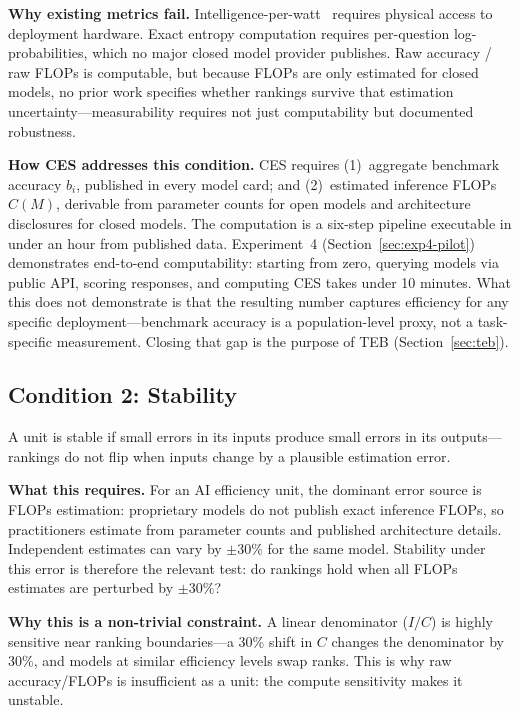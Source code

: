 \documentclass[12pt]{article}
\begin{document}
\textbf{Why existing metrics fail.} Intelligence-per-watt~\cite{saadfalcon2024} requires
physical access to deployment hardware. Exact entropy computation requires per-question
log-probabilities, which no major closed model provider publishes. Raw accuracy / raw FLOPs
is computable, but because FLOPs are only estimated for closed models, no prior work
specifies whether rankings survive that estimation uncertainty---measurability requires not
just computability but documented robustness.

\textbf{How CES addresses this condition.} CES requires (1)~aggregate benchmark accuracy
$b_i$, published in every model card; and (2)~estimated inference FLOPs $C(M)$, derivable
from parameter counts for open models and architecture disclosures for closed models. The
computation is a six-step pipeline executable in under an hour from published data.
Experiment~4 (Section~\ref{sec:exp4-pilot}) demonstrates end-to-end computability: starting
from zero, querying models via public API, scoring responses, and computing CES takes under
10 minutes. What this does not demonstrate is that the resulting number captures efficiency
for any specific deployment---benchmark accuracy is a population-level proxy, not a
task-specific measurement. Closing that gap is the purpose of TEB (Section~\ref{sec:teb}).

\subsection{Condition 2: Stability}

A unit is stable if small errors in its inputs produce small errors in its outputs---rankings
do not flip when inputs change by a plausible estimation error.

\textbf{What this requires.} For an AI efficiency unit, the dominant error source is FLOPs
estimation: proprietary models do not publish exact inference FLOPs, so practitioners
estimate from parameter counts and published architecture details. Independent estimates can
vary by $\pm30\%$ for the same model. Stability under this error is therefore the relevant
test: do rankings hold when all FLOPs estimates are perturbed by $\pm30\%$?

\textbf{Why this is a non-trivial constraint.} A linear denominator ($I/C$) is highly
sensitive near ranking boundaries---a 30\% shift in $C$ changes the denominator by 30\%,
and models at similar efficiency levels swap ranks. This is why raw accuracy/FLOPs is
insufficient as a unit: the compute sensitivity makes it unstable.
\end{document}
